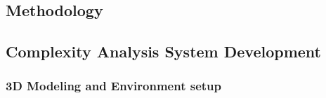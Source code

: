 \begin{linenumbers}
\section{Methodology}
\label{sec:Methodology}




\subsection{Complexity Analysis System Development}
\label{subsec:ComplexitySystemDevelopment}





\subsubsection{3D Modeling and Environment setup}
\label{subsubsec:3DModeling}



\end{linenumbers}
